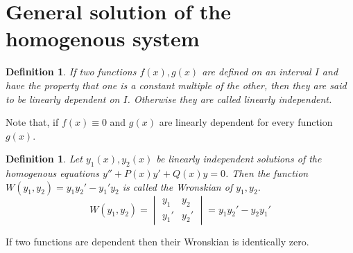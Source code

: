 \documentclass[oneside,11pt,pdftex,final]{book}%
\numberwithin{equation}{section}
\newtheorem{definition}[theorem]{Definition}
\numberwithin{section}{chapter}
\numberwithin{equation}{chapter}
\begin{document}
\section{General solution of the homogenous system}

\begin{definition}\label{def:lindep}
	If two functions $ f(x) ,g(x)$ are defined on an interval $ I $ and have the property that one is a constant multiple of the other, then they are said to be linearly dependent on $ I $. Otherwise they are called linearly independent.
\end{definition}
Note that, if $ f(x) \equiv 0$ and $ g(x) $ are linearly dependent for every function $ g(x) $.


\begin{definition}\label{def:wronskian}
	Let $ y_1(x) ,y_2(x)$ be linearly independent solutions of the homogenous equations $ y''+P(x) y'+Q(x)y=0$. Then the function $ W(y_1,y_2)=y_1y_2'-y_1'y_2 $ is called the Wronskian of $ y_1,y_2 $.\\
	\[ W(y_1,y_2)= \begin{vmatrix}
		y_1 & y_2 \\ 
		y_1' & y_2' 
	\end{vmatrix}=y_1y_2'-y_2y_1'\]
\end{definition}
If two functions are dependent then their Wronskian is identically zero.
\end{document}
